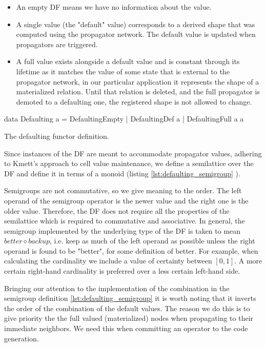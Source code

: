 \begin{itemize}
\item An empty DF means we have no information about the value.
\item A single value (the "default" value) corresponds to a derived
  shape that was computed using the propagator network. The default
  value is updated when propagators are triggered.
\item A full value exists alongside a default value and is constant
  through its lifetime as it matches the value of some state that is
  external to the propagator network, in our particular application it
  represents the shape of a materialized relation. Until that relation
  is deleted, and the full propagator is demoted to a defaulting one,
  the registered shape is not allowed to change.
\end{itemize}

\begin{code}
  \begin{haskellcode}
    data Defaulting a =
      DefaultingEmpty
      | DefaultingDef a
      | DefaultingFull a a
  \end{haskellcode}

  \caption{\label{lst:defaulting_functor}The defaulting functor definition.}
\end{code}

Since instances of the DF are meant to accommodate propagator values,
adhering to Kmett's approach to cell value maintenance, we define a
semilattice over the DF and define it in terms of a monoid (listing
\ref{lst:defaulting_semigroup} ).

Semigroups are not commutative, so we give meaning to the order. The
left operand of the semigroup operator is the newer value and the
right one is the older value. Therefore, the DF does not require all
the properties of the semilattice which is required to commutative and
associative. In general, the semigroup implemented by the underlying
type of the DF is taken to mean
\(\mathit{better} \diamond \mathit{backup}\), i.e. keep as much of the
left operand as possible unless the right operand is found to be
"better", for some definition of better. For example, when calculating
the cardinality we include a value of certainty between
\(\left[0,1\right]\).  A more certain right-hand cardinality is
preferred over a less certain left-hand side.

Bringing our attention to the implementation of the 
combination in the semigroup definition \ref{lst:defaulting_semigroup}
it is worth noting that it inverts the order of the combination of the
default values. The reason we do this is to give priority the the full
valued (materialized) nodes when propagating to their immediate
neighbors. We need this when committing an operator to the code
generation.

